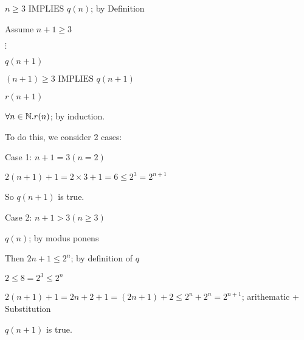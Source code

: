 \documentclass[12pt]{alittlebear}
\newcommand{\iimplies}{\,\,\mathrm{IMPLIES}\,\,}
\begin{document}
{{\begin{adjustwidth}{1cm}{}
            $n\geq 3\iimplies q(n)$; by Definition

            \begin{adjustwidth}{1.5cm}{}

                Assume $n+1\geq 3$

                $\vdots$

                $q(n+1)$

            \end{adjustwidth}

            $(n+1)\geq 3\iimplies q(n+1)$

            $r(n+1)$

        \end{adjustwidth}

        $\forall n\in\mathbb{N}. r(n)$; by induction.

        To do this, we consider 2 cases:

        Case 1: $n+1=3 (n=2)$

        \begin{adjustwidth}{1cm}{}

            $2(n+1)+1=2\times 3+1=6\leq 2^3=2^{n+1}$

            So $q(n+1)$ is true.

        \end{adjustwidth}

        Case 2: $n+1>3 (n\geq 3)$

        \begin{adjustwidth}{1cm}{}

            $q(n)$; by modus ponens

            Then $2n+1\leq 2^n$; by definition of $q$

            $2\leq 8 =2^3\leq 2^n$

            $2(n+1)+1=2n+2+1=(2n+1)+2\leq 2^n+2^n=2^{n+1}$; arithematic + Substitution

            $q(n+1)$ is true.

        \end{adjustwidth}
    }
}
\end{document}
